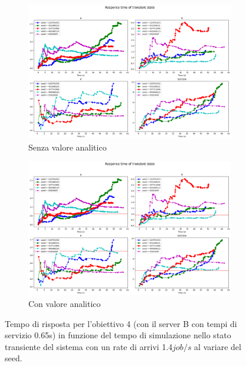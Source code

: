 \begin{figure}
    \centering
    \begin{subfigure}{\linewidth}
        \centering
        \includegraphics[width=0.8\linewidth]{figs/appendices/transient/obj4_065-transient-rtime.png}
        \caption{Senza valore analitico}
        \label{fig:obj4_065_transient_simulation}
        \end{subfigure} 
    \begin{subfigure}{\linewidth}
        \centering
        \includegraphics[width=0.8\linewidth]{figs/appendices/transient/obj4_065-transient-rtime-analitycal.png}
        \caption{Con valore analitico}
        \label{fig:obj4_065_transient_analitycal}
        \end{subfigure}
    \caption{Tempo di risposta per l'obiettivo 4 (con il server B con tempi di servizio 0.65s) in funzione del tempo di simulazione nello stato transiente del sistema con un rate di arrivi 1.4$job/s$ al variare del seed.}
    \label{fig:obj4_065_transient}
\end{figure}


